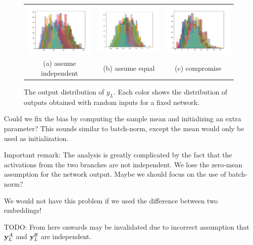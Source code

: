 \begin{figure}[H]
\centering
\begin{tabular}{c @{} c @{} c}
\includegraphics[width=40mm]{figures/siamese_hist_independent} &
\includegraphics[width=40mm]{figures/siamese_hist_equal} &
\includegraphics[width=40mm]{figures/siamese_hist_compromise} \\
(a) assume independent &
(b) assume equal &
(c) compromise \\
\end{tabular}
\caption{
  The output distribution of $y_{L}$.
  Each color shows the distribution of outputs obtained with random inputs for a fixed network.
}
\end{figure}

Could we fix the bias by computing the sample mean and initializing an extra parameter?
This sounds similar to batch-norm, except the mean would only be used as initialization.

Important remark: The analysis is greatly complicated by the fact that the activations from the two branches are not independent.
We lose the zero-mean assumption for the network output.
Maybe we should focus on the use of batch-norm?

We would not have this problem if we used the difference between two embeddings!

TODO: From here onwards may be invalidated due to incorrect assumption that $\boldsymbol{\mathbf{y}}_{L}^{\mathcal{A}}$ and $\boldsymbol{\mathbf{y}}_{L}^{\mathcal{B}}$ are independent.

